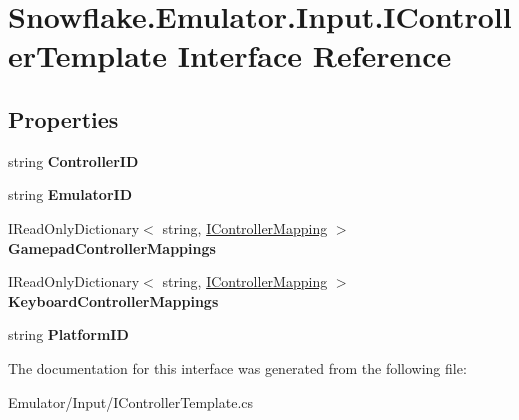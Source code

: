 \hypertarget{interface_snowflake_1_1_emulator_1_1_input_1_1_i_controller_template}{}\section{Snowflake.\+Emulator.\+Input.\+I\+Controller\+Template Interface Reference}
\label{interface_snowflake_1_1_emulator_1_1_input_1_1_i_controller_template}
\subsection*{Properties}
\begin{DoxyCompactItemize}
\item 
\hypertarget{interface_snowflake_1_1_emulator_1_1_input_1_1_i_controller_template_a8d7fbc937f5863e413c5524a1eab489f}{}string {\bfseries Controller\+I\+D}\label{interface_snowflake_1_1_emulator_1_1_input_1_1_i_controller_template_a8d7fbc937f5863e413c5524a1eab489f}

\item 
\hypertarget{interface_snowflake_1_1_emulator_1_1_input_1_1_i_controller_template_a5c9b08770e74a4b37366b1c01f86f208}{}string {\bfseries Emulator\+I\+D}\label{interface_snowflake_1_1_emulator_1_1_input_1_1_i_controller_template_a5c9b08770e74a4b37366b1c01f86f208}

\item 
\hypertarget{interface_snowflake_1_1_emulator_1_1_input_1_1_i_controller_template_ab2a6cfe7957c324852a3e05043b0fa33}{}I\+Read\+Only\+Dictionary$<$ string, \hyperlink{interface_snowflake_1_1_emulator_1_1_input_1_1_i_controller_mapping}{I\+Controller\+Mapping} $>$ {\bfseries Gamepad\+Controller\+Mappings}\label{interface_snowflake_1_1_emulator_1_1_input_1_1_i_controller_template_ab2a6cfe7957c324852a3e05043b0fa33}

\item 
\hypertarget{interface_snowflake_1_1_emulator_1_1_input_1_1_i_controller_template_a2739057e1d2568bc59c9782711b09622}{}I\+Read\+Only\+Dictionary$<$ string, \hyperlink{interface_snowflake_1_1_emulator_1_1_input_1_1_i_controller_mapping}{I\+Controller\+Mapping} $>$ {\bfseries Keyboard\+Controller\+Mappings}\label{interface_snowflake_1_1_emulator_1_1_input_1_1_i_controller_template_a2739057e1d2568bc59c9782711b09622}

\item 
\hypertarget{interface_snowflake_1_1_emulator_1_1_input_1_1_i_controller_template_a77d7441fa1d5fe4645c0249536e8e666}{}string {\bfseries Platform\+I\+D}\label{interface_snowflake_1_1_emulator_1_1_input_1_1_i_controller_template_a77d7441fa1d5fe4645c0249536e8e666}

\end{DoxyCompactItemize}


The documentation for this interface was generated from the following file\+:\begin{DoxyCompactItemize}
\item 
Emulator/\+Input/I\+Controller\+Template.\+cs\end{DoxyCompactItemize}
